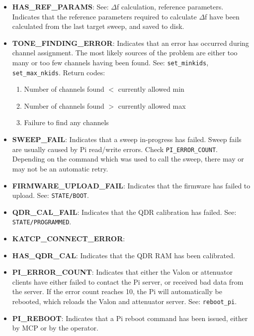 \begin{itemize}[leftmargin=*,label={}]
\item \textbf{HAS\_REF\_PARAMS}: See: $\Delta$f calculation, reference parameters. Indicates that the reference parameters required to calculate $\Delta$f have been calculated from the last target sweep, and saved to disk.

\item \textbf{TONE\_FINDING\_ERROR}: Indicates that an error has occurred during channel assignment. The most likely sources of the problem are either too many or too few channels having been found. See: \texttt{set\_minkids}, \texttt{set\_max\_nkids}.
Return codes:
\begin{enumerate}
  \item Number of channels found $<$ currently allowed min
  \item Number of channels found $>$ currently allowed max
  \item Failure to find any channels
\end{enumerate}

\item \textbf{SWEEP\_FAIL}: Indicates that a sweep in-progress has failed. Sweep fails are usually caused by Pi read/write errors. Check \texttt{PI\_ERROR\_COUNT}. Depending on the command which was used to call the sweep, there may or may not be an automatic retry.

\item \textbf{FIRMWARE\_UPLOAD\_FAIL}: Indicates that the firmware has failed to upload. See: \texttt{STATE/BOOT}.

\item \textbf{QDR\_CAL\_FAIL}: Indicates that the QDR calibration has failed. See: \texttt{STATE/PROGRAMMED}.

\item \textbf{KATCP\_CONNECT\_ERROR}:

\item \textbf{HAS\_QDR\_CAL}: Indicates that the QDR RAM has been calibrated.

\item \textbf{PI\_ERROR\_COUNT}: Indicates that either the Valon or attenuator
 clients have either failed to contact the Pi server, or received bad data from the server. If the error count reaches 10, the Pi will automatically be rebooted, which reloads the Valon and attenuator server. See: \texttt{reboot\_pi}.

\item \textbf{PI\_REBOOT}: Indicates that a Pi reboot command has been issued, either by MCP or by the operator.


\end{itemize}
